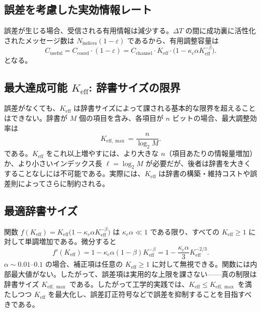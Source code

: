\documentclass[12pt,a4paper]{article}
\theoremstyle{definition}
\theoremstyle{remark}
\newcommand{\Keff}{K_{\mathrm{eff}}}
\newcommand{\Keffmax}{K_{\mathrm{eff},\max}}
\begin{document}
	\subsection{誤差を考慮した実効情報レート}
	
	誤差が生じる場合、受信される有用情報は減少する。$\Delta T$ の間に成功裏に活性化されたメッセージ数は $N_{\text{indices}}(1 - \varepsilon)$ であるから、有用調整容量は
	\begin{equation}
		C_{\text{useful}} = C_{\text{coord}} \cdot (1 - \varepsilon) = C_{\text{channel}} \cdot \Keff \cdot \bigl(1 - \kappa_c \alpha K_{\mathrm{eff}}^{-\beta}\bigr).
		\label{eq:useful-rate}
	\end{equation}
	となる。
	
	\subsection{最大達成可能 $\Keff$: 辞書サイズの限界}
	
	誤差がなくても、$\Keff$ は辞書サイズによって課される基本的な限界を超えることはできない。辞書が $M$ 個の項目を含み、各項目が $n$ ビットの場合、最大調整効率は
	\begin{equation}
		\Keffmax = \frac{n}{\log_2 M}. \label{eq:keff-max}
	\end{equation}
	である。$\Keff$ をこれ以上増やすには、より大きな $n$（項目あたりの情報量増加）か、より小さいインデックス長 $\ell = \log_2 M$ が必要だが、後者は辞書を大きくすることなしには不可能である。実際には、$\Keff$ は辞書の構築・維持コストや誤差則によってさらに制約される。
	
	\subsection{最適辞書サイズ}
	
	関数 $f(\Keff) = \Keff \bigl(1 - \kappa_c \alpha K_{\mathrm{eff}}^{-\beta}\bigr)$ は $\kappa_c\alpha \ll 1$ である限り、すべての $\Keff \ge 1$ に対して単調増加である。微分すると
	\[
	f'(\Keff) = 1 - \kappa_c\alpha(1-\beta)K_{\mathrm{eff}}^{-\beta} = 1 - \frac{\kappa_c\alpha}{3} K_{\mathrm{eff}}^{-2/3}.
	\]
	$\alpha \sim 0.01$–$0.1$ の場合、補正項は任意の $\Keff \ge 1$ に対して無視できる。関数には内部最大値がない。したがって、誤差項は実用的な上限を課さない——真の制限は辞書サイズ $\Keffmax$ である。したがって工学的実践では、$\Keff \le \Keffmax$ を満たしつつ $\Keff$ を最大化し、誤差訂正符号などで誤差を抑制することを目指すべきである。
	
\end{document}

